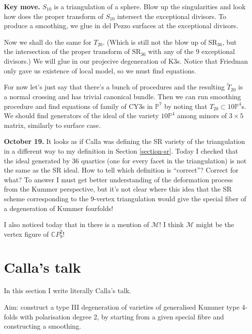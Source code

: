 {\bf Key move.}
$S_{10}$ is a triangulation of a sphere.
Blow up the singularities and look
how does the proper transform of $S_{10}$ 
intersect the exceptional divisors.
To produce a smoothing,
we glue in del Pezzo surfaces
at the exceptional divisors.

Now we shall do the same for $T_{20}$.
(Which is still not the blow up
of $\text{SR}_{36}$, but the intersection
of the proper transform of $\text{SR}_{36}$ 
with any of the 9 exceptional divisors.)
We will glue in our projecive degeneration of K3s.
Notice that Friedman only gave us existence
of local model, so we must find equations.

For now let's just say that there's a bunch of procedures and
the resulting $\tilde{T}_{20}$ is a normal crossing and 
has trivial canonical bundle.
Then we can run smoothing procedure and find equations of family
of CY3s in $\mathbb{P}^7$ by noting that $T_{20} \subset 10 \mathbb{P}^4$s.
We should find generators of the ideal of
the variety $10\mathbb{P}^4$
among minors of $3\times 5$ matrix, similarly to surface case.

\medskip\noindent
{\bf October 19.}
It looks as if Calla was defining the SR variety of the triangulation
in a different way to my definition in Section \ref{section-sr}.
Today I checked that the ideal generated by 36 quartics
(one for every facet in the triangulation)
is not the same as the SR ideal.
How to tell which definition is ``correct''?
Correct for what? To answer I must get better understanding
of the deformation process from the Kummer perspective,
but it's not clear where this idea that the SR scheme
corresponding to the 9-vertex triangulation
would give the special fiber of a degeneration of
Kummer fourfolds!

I also noticed today that in \cite{KuhnelBanchoff1983}
there is a mention of $\mathcal{M}$!
I think $\mathcal{M}$ might be the vertex figure of $\mathbb{C}P^2_9$!


\section{Calla's talk}
\label{section-calla-talk}

\noindent
In this section I write literally Calla's talk.

\medskip\noindent
Aim: construct a type III
degeneration of varieties of generalised Kummer type 4-folds
with polarisation degree 2,
by starting from a given special fibre and constructing a smoothing.

